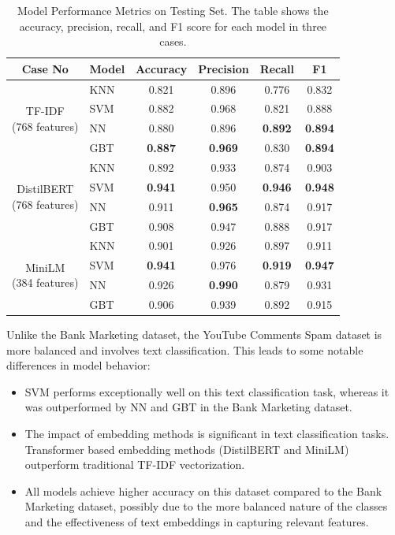 \documentclass[conference]{IEEEtran}
\begin{document}
\begin{table}[htbp]
    \centering
    \begin{tabular}{|c|l|c|c|c|c|}
    \hline
    Case No & Model & Accuracy & Precision & Recall & F1 \\
    \hline
    \multirow{4}{*}{\parbox{1.2cm}{TF-IDF \\ (768 features)}} 
    & KNN & 0.821 & 0.896 & 0.776 & 0.832 \\
    & SVM & 0.882 & 0.968 & 0.821 & 0.888 \\
    & NN & 0.880 & 0.896 & \textbf{0.892} & \textbf{0.894} \\
    & GBT & \textbf{0.887} & \textbf{0.969} & 0.830 & \textbf{0.894} \\
    \hline
    \multirow{4}{*}{\parbox{1.2cm}{DistilBERT\\(768 features)}}
    & KNN & 0.892 & 0.933 & 0.874 & 0.903 \\
    & SVM & \textbf{0.941} & 0.950 & \textbf{0.946} & \textbf{0.948} \\
    & NN & 0.911 & \textbf{0.965} & 0.874 & 0.917 \\
    & GBT & 0.908 & 0.947 & 0.888 & 0.917 \\
    \hline
    \multirow{4}{*}{\parbox{1.2cm}{MiniLM\\ (384 features)}}
    & KNN & 0.901 & 0.926 & 0.897 & 0.911 \\
    & SVM & \textbf{0.941} & 0.976 & \textbf{0.919} & \textbf{0.947} \\
    & NN & 0.926 & \textbf{0.990} & 0.879 & 0.931 \\
    & GBT & 0.906 & 0.939 & 0.892 & 0.915 \\
    \hline
    \end{tabular}
    \caption{Model Performance Metrics on Testing Set. The table shows the accuracy, precision, recall, and F1 score for each model in three cases.}
    \label{tab:model-performance-dataset2}
\end{table}

Unlike the Bank Marketing dataset, the YouTube Comments Spam dataset is more balanced and involves text classification. This leads to some notable differences in model behavior:
\begin{itemize}
    \item SVM performs exceptionally well on this text classification task, whereas it was outperformed by NN and GBT in the Bank Marketing dataset.
    \item The impact of embedding methods is significant in text classification tasks. Transformer based embedding methods (DistilBERT and MiniLM) outperform traditional TF-IDF vectorization.
    \item All models achieve higher accuracy on this dataset compared to the Bank Marketing dataset, possibly due to the more balanced nature of the classes and the effectiveness of text embeddings in capturing relevant features.
\end{itemize}
\end{document}
